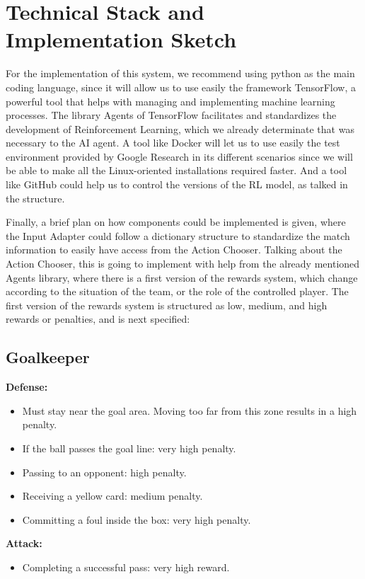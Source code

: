 \documentclass{article}
\begin{document}
\section*{Technical Stack and Implementation Sketch}
For the implementation of this system, we recommend using python as the main coding language, since it will allow us to use easily the framework TensorFlow, a powerful tool that helps with managing and implementing machine learning processes. The library Agents of TensorFlow facilitates and standardizes the development of Reinforcement Learning, which we already determinate that was necessary to the AI agent. A tool like Docker will let us to use easily the test environment provided by Google Research in its different scenarios since we will be able to make all the Linux-oriented installations required faster. And a tool like GitHub could help us to control the versions of the RL model, as talked in the structure.

Finally, a brief plan on how components could be implemented is given, where the Input Adapter could follow a dictionary structure to standardize the match information to easily have access from the Action Chooser. Talking about the Action Chooser, this is going to implement with help from the already mentioned Agents library, where there is a first version of the rewards system, which change according to the situation of the team, or the role of the controlled player. The first version of the rewards system is structured as low, medium, and high rewards or penalties, and is next specified:

\subsection*{Goalkeeper}
\textbf{Defense:}
\begin{itemize}
    \item Must stay near the goal area. Moving too far from this zone results in a high penalty.
    \item If the ball passes the goal line: very high penalty.
    \item Passing to an opponent: high penalty.
    \item Receiving a yellow card: medium penalty.
    \item Committing a foul inside the box: very high penalty.
\end{itemize}

\textbf{Attack:}
\begin{itemize}
    \item Completing a successful pass: very high reward.
\end{itemize}
\end{document}
